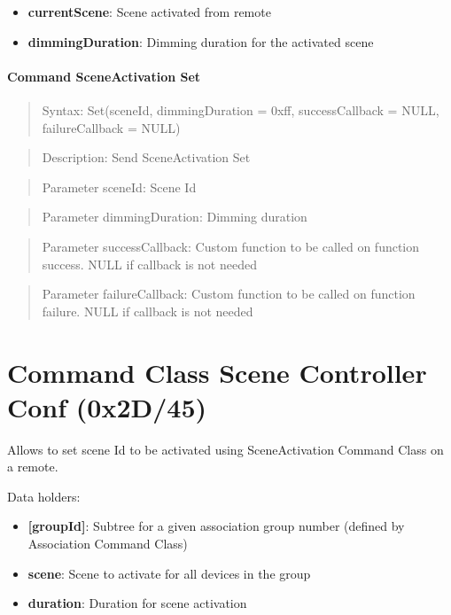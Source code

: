 \begin{itemize}
\item \textbf{currentScene}: Scene activated from remote
\item \textbf{dimmingDuration}: Dimming duration for the activated scene
\end{itemize}

\paragraph{Command SceneActivation Set}
\begin{quote}Syntax: Set(sceneId, dimmingDuration = 0xff, successCallback = NULL, failureCallback = NULL)\end{quote}
\begin{quote}Description: Send SceneActivation Set\end{quote}
\begin{quote}Parameter sceneId: Scene Id\end{quote}
\begin{quote}Parameter dimmingDuration: Dimming duration\end{quote}
\begin{quote}Parameter successCallback: Custom function to be called on function success. NULL if callback is not needed\end{quote}
\begin{quote}Parameter failureCallback: Custom function to be called on function failure. NULL if callback is not needed\end{quote}



\section{Command Class Scene Controller Conf (0x2D/45)}

Allows to set scene Id to be activated using SceneActivation Command Class on a remote.
\newline

\noindent
Data holders:

\begin{itemize}
\item \textbf{[groupId]}: Subtree for a given association group number (defined by Association Command Class)
\item \qquad\textbf{scene}: Scene to activate for all devices in the group
\item \qquad\textbf{duration}: Duration for scene activation
\end{itemize}

